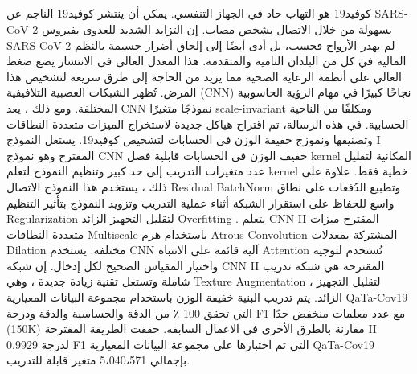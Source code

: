\begin{arab}[utf]
\chapter*{} %
\label{araSummery} 

    كوفيد19 هو التهاب حاد في الجهاز التنفسي. يمكن أن ينتشر كوفيد19 الناجم عن SARS-CoV-2 بسهولة من خلال الاتصال بشخص مصاب. إن التزايد الشديد للعدوى بفيروس SARS-CoV-2 لم يهدر الأرواح فحسب، بل أدى أيضًا إلى إلحاق أضرار جسيمة بالنظم المالية في كل من البلدان النامية والمتقدمة. هذا  المعدل العالى فى الانتشار يضع ضغط العالي على أنظمة الرعاية الصحية مما يزيد من الحاجة إلى طرق سريعة لتشخيص هذا المرض. تُظهر الشبكات العصبية التلافيفية (CNN) نجاحًا كبيرًا في مهام الرؤية الحاسوبية المختلفة. ومع ذلك ، يعد CNN نموذجًا متغيرًا scale-invariant ومكلفًا من الناحية الحسابية. في هذه الرسالة، تم اقتراح هياكل جديدة لاستخراج الميزات متعددة النطاقات وتصنيفها ونموزج خفيفة الوزن فى الحسابات لتشخيص كوفيد19. يستغل النموذج I المقترح وهو نموذج CNN خفيف الوزن فى الحسابات قابلية فصل kernel المكانية لتقليل عدد متغيرات التدريب إلى حد كبير وتنظيم النموذج لتعلم kernel خطية فقط. علاوة على ذلك ، يستخدم هذا النموذج الاتصال Residual BatchNorm وتطبيع الدُفعات على نطاق واسع للحفاظ على استقرار الشبكة أثناء عملية التدريب وتزويد النموذج بتأثير التنظيم Regularization لتقليل التجهيز الزائد Overfitting . يتعلم CNN II المقترح ميزات متعددة النطاقات Multiscale  باستخدام هرم Atrous Convolution المشتركة بمعدلات Dilation مختلفة. يستخدم  CNN  آلية قائمة على الانتباه Attention تُستخدم لتوجيه واختيار المقياس الصحيح لكل إدخال. إن شبكة CNN II المقترحة هي شبكة تدريب شاملة وتستغل تقنية زيادة جديدة ، وهي Texture Augmentation ، لتقليل التجهيز الزائد. يتم تدريب البنية خفيفة الوزن باستخدام مجموعة البيانات المعيارية QaTa-Cov19 التي تحقق 100 ٪ من الدقة والحساسية والدقة ودرجة F1 مع عدد معلمات منخفض جدًا (150K) مقارنة بالطرق الأخرى في الاعمال السابقه. حققت الطريقة المقترحة II 0.9929 لدرجة F1 التي تم اختبارها على مجموعة البيانات المعيارية QaTa-Cov19 بإجمالي 5،040،571 متغير قابلة للتدريب.


\end{arab}
